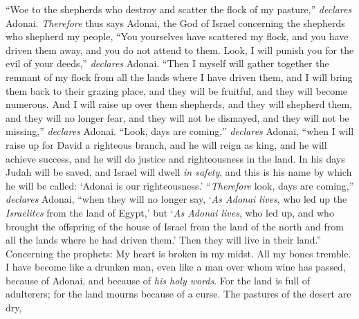 \begin{biblechapter} %
 “Woe to the shepherds who destroy and scatter the flock of my pasture,” \textit{declares} Adonai.
\verse \textit{Therefore} thus says Adonai, the God of Israel concerning the shepherds who shepherd my people, “You yourselves have scattered my flock, and you have driven them away, and you do not attend to them. Look, I will punish you for the evil of your deeds,” \textit{declares} Adonai.
\verse “Then I myself will gather together the remnant of my flock from all the lands where I have driven them, and I will bring them back to their grazing place, and they will be fruitful, and they will become numerous.
\verse And I will raise up over them shepherds, and they will shepherd them, and they will no longer fear, and they will not be dismayed, and they will not be missing,” \textit{declares} Adonai.
 “Look, days are coming,” \textit{declares} Adonai, 
“when I will raise up for David a righteous branch, 
and he will reign as king, and he will achieve success, 
and he will do justice and righteousness in the land.
\verse In his days Judah will be saved, 
and Israel will dwell \textit{in safety}, 
and this is his name by which he will be called: 
‘Adonai is our righteousness.’
\verse “\textit{Therefore} look, days are coming,” \textit{declares} Adonai, “when they will no longer say, ‘\textit{As Adonai lives}, who led up the \textit{Israelites} from the land of Egypt,’
\verse but ‘\textit{As Adonai lives}, who led up, and who brought the offspring of the house of Israel from the land of the north and from all the lands where he had driven them.’ Then they will live in their land.”
 Concerning the prophets:
\verse My heart is broken in my midst. 
All my bones tremble. 
I have become like a drunken man, 
even like a man over whom wine has passed, 
because of Adonai, 
and because of \textit{his holy words}.
\verse For the land is full of adulterers; 
for the land mourns because of a curse. 
The pastures of the desert are dry, 

\end{biblechapter}
